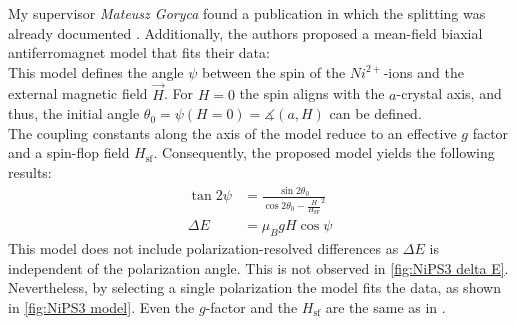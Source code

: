\documentclass[
	oneside,
	parskip=half,
	a4paper,
]{scrbook}
\begin{document}
My supervisor \textit{Mateusz Goryca} found a publication in which the splitting was already documented \autocite{NiPS3_magnon_gap}.
Additionally, the authors proposed a mean-field biaxial antiferromagnet model that fits their data:\\
This model defines the angle $\psi$ between the spin of the $Ni^{2+}$-ions and the external magnetic field $\vec{H}$.
For $H=0$ the spin aligns with the $a$-crystal axis, and thus, the initial angle $\theta_0=\psi\left(H=0\right)=\measuredangle\left(a, H\right)$ can be defined.\\
The coupling constants along the axis of the model reduce to an effective $g$ factor and a spin-flop field $H_\text{sf}$. 
Consequently, the proposed model \autocite{NiPS3_magnon_gap} yields the following results:
\begin{align}
	\tan 2\psi &= \frac{\sin 2\theta_0}{\cos 2\theta_0 - \frac{H}{H_\text{SF}}^2}\\
	\Delta E &= \mu_B g H \cos \psi
	\label{eq:NiPS3 model}
\end{align}
This model does not include polarization-resolved differences as $\Delta E$ is independent of the polarization angle.
This is not observed in \autoref{fig:NiPS3 delta E}.\\
Nevertheless, by selecting a single polarization the model fits the data, as shown in \autoref{fig:NiPS3 model}.
Even the $g$-factor and the $H_\text{sf}$ are the same as in \autocite{NiPS3_magnon_gap}.
\end{document}
